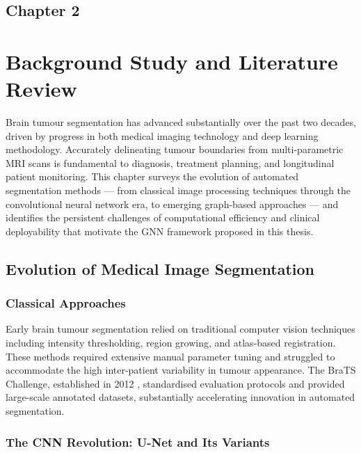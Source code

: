 \begin{center}
    \section*{\fontsize{20}{20}\selectfont Chapter 2}
\end{center}
\vspace{10mm}
\section{Background Study and Literature Review}

Brain tumour segmentation has advanced substantially over the past two decades, driven by progress in both medical imaging technology and deep learning methodology. Accurately delineating tumour boundaries from multi-parametric MRI scans is fundamental to diagnosis, treatment planning, and longitudinal patient monitoring. This chapter surveys the evolution of automated segmentation methods — from classical image processing techniques through the convolutional neural network era, to emerging graph-based approaches — and identifies the persistent challenges of computational efficiency and clinical deployability that motivate the GNN framework proposed in this thesis.

\subsection{Evolution of Medical Image Segmentation}

\subsubsection{Classical Approaches}

Early brain tumour segmentation relied on traditional computer vision techniques including intensity thresholding, region growing, and atlas-based registration. These methods required extensive manual parameter tuning and struggled to accommodate the high inter-patient variability in tumour appearance. The BraTS Challenge, established in 2012 \cite{menze2015multimodal}, standardised evaluation protocols and provided large-scale annotated datasets, substantially accelerating innovation in automated segmentation.

\subsubsection{The CNN Revolution: U-Net and Its Variants}


